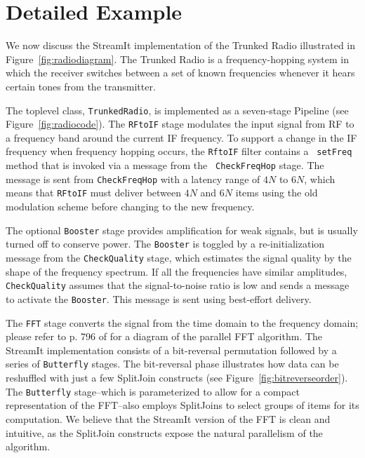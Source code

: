 \section{Detailed Example}
\label{sec:example}

We now discuss the StreamIt implementation of the Trunked Radio
illustrated in Figure~\ref{fig:radiodiagram}.  The Trunked Radio is a
frequency-hopping system in which the receiver switches between a set of
known frequencies whenever it hears certain tones from the transmitter.

The toplevel class, {\tt TrunkedRadio}, is implemented as a seven-stage
Pipeline (see Figure~\ref{fig:radiocode}).  The {\tt RFtoIF} stage
modulates the input signal from RF to a frequency band around the
current IF frequency.  To support a change in the IF frequency when
frequency hopping occurs, the {\tt RftoIF} filter contains a {\tt
setFreq} method that is invoked via a message from the {\tt
CheckFreqHop} stage.  The message is sent from {\tt CheckFreqHop} with a
latency range of $4N$ to $6N$, which means that {\tt RFtoIF} must
deliver between $4N$ and $6N$ items using the old modulation scheme
before changing to the new frequency.

The optional {\tt Booster} stage provides amplification for weak
signals, but is usually turned off to conserve power.  The {\tt Booster}
is toggled by a re-initialization message from the {\tt CheckQuality}
stage, which estimates the signal quality by the shape of the frequency
spectrum.  If all the frequencies have similar amplitudes, {\tt
CheckQuality} assumes that the signal-to-noise ratio is low and sends a
message to activate the {\tt Booster}.  This message is sent using
best-effort delivery.

The {\tt FFT} stage converts the signal from the time domain to the
frequency domain; please refer to p. 796 of \cite{clr} for a diagram
of the parallel FFT algorithm.  The StreamIt implementation consists
of a bit-reversal permutation followed by a series of {\tt Butterfly}
stages.  The bit-reversal phase illustrates how data can be reshuffled
with just a few SplitJoin constructs (see
Figure~\ref{fig:bitreverseorder}).  The {\tt Butterfly} stage--which
is parameterized to allow for a compact representation of the
FFT--also employs SplitJoins to select groups of items for its
computation.  We believe that the StreamIt version of the FFT is clean
and intuitive, as the SplitJoin constructs expose the natural
parallelism of the algorithm.




